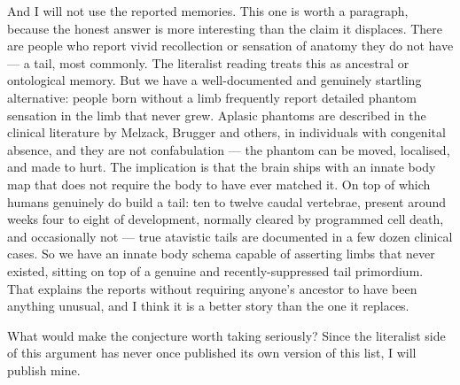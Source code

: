 And I will not use the reported memories. This one is worth a paragraph, because the honest answer
is more interesting than the claim it displaces. There are people who report vivid recollection or
sensation of anatomy they do not have --- a tail, most commonly. The literalist reading treats this
as ancestral or ontological memory. But we have a well-documented and genuinely startling
alternative: people born without a limb frequently report detailed phantom sensation in the limb
that never grew. Aplasic phantoms are described in the clinical literature by Melzack, Brugger and
others, in individuals with congenital absence, and they are not confabulation --- the phantom can
be moved, localised, and made to hurt. The implication is that the brain ships with an innate
body map that does not require the body to have ever matched it. On top of which humans genuinely
do build a tail: ten to twelve caudal vertebrae, present around weeks four to eight of development,
normally cleared by programmed cell death, and occasionally not --- true atavistic tails are
documented in a few dozen clinical cases. So we have an innate body schema capable of asserting
limbs that never existed, sitting on top of a genuine and recently-suppressed tail primordium. That
explains the reports without requiring anyone's ancestor to have been anything unusual, and I think
it is a better story than the one it replaces.

What would make the conjecture worth taking seriously? Since the literalist side of this argument
has never once published its own version of this list, I will publish mine.

